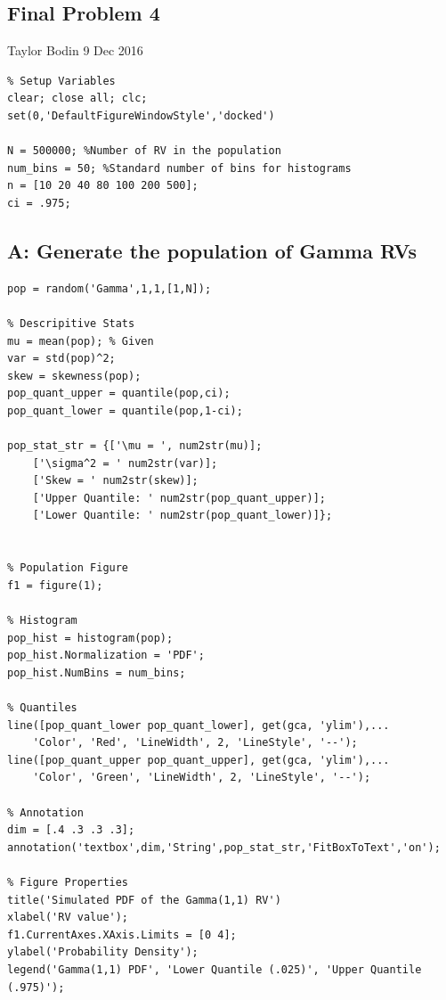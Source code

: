\documentclass[12pt]{article}
\begin{document}
\subsection*{Final Problem 4}

\begin{par}
Taylor Bodin 9 Dec 2016
\end{par} \vspace{1em}
\begin{verbatim}
% Setup Variables
clear; close all; clc;
set(0,'DefaultFigureWindowStyle','docked')

N = 500000; %Number of RV in the population
num_bins = 50; %Standard number of bins for histograms
n = [10 20 40 80 100 200 500];
ci = .975;
\end{verbatim}


\subsection*{A: Generate the population of Gamma RVs}

\begin{verbatim}
pop = random('Gamma',1,1,[1,N]);

% Descripitive Stats
mu = mean(pop); % Given
var = std(pop)^2;
skew = skewness(pop);
pop_quant_upper = quantile(pop,ci);
pop_quant_lower = quantile(pop,1-ci);

pop_stat_str = {['\mu = ', num2str(mu)];
    ['\sigma^2 = ' num2str(var)];
    ['Skew = ' num2str(skew)];
    ['Upper Quantile: ' num2str(pop_quant_upper)];
    ['Lower Quantile: ' num2str(pop_quant_lower)]};


% Population Figure
f1 = figure(1);

% Histogram
pop_hist = histogram(pop);
pop_hist.Normalization = 'PDF';
pop_hist.NumBins = num_bins;

% Quantiles
line([pop_quant_lower pop_quant_lower], get(gca, 'ylim'),...
    'Color', 'Red', 'LineWidth', 2, 'LineStyle', '--');
line([pop_quant_upper pop_quant_upper], get(gca, 'ylim'),...
    'Color', 'Green', 'LineWidth', 2, 'LineStyle', '--');

% Annotation
dim = [.4 .3 .3 .3];
annotation('textbox',dim,'String',pop_stat_str,'FitBoxToText','on');

% Figure Properties
title('Simulated PDF of the Gamma(1,1) RV')
xlabel('RV value');
f1.CurrentAxes.XAxis.Limits = [0 4];
ylabel('Probability Density');
legend('Gamma(1,1) PDF', 'Lower Quantile (.025)', 'Upper Quantile (.975)');
\end{verbatim}
\end{document}
